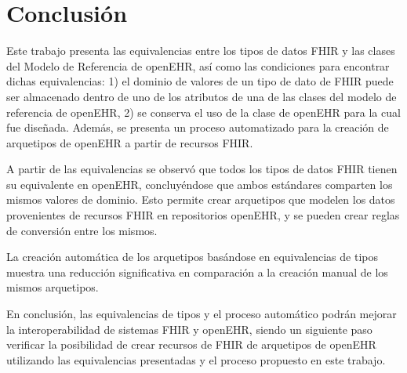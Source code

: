 \section{Conclusión}

Este trabajo presenta las equivalencias entre los tipos de datos FHIR y las clases del Modelo de Referencia de openEHR, así como las condiciones para encontrar dichas equivalencias: 1) el dominio de valores de un tipo de dato de FHIR puede ser almacenado dentro de uno de los atributos de una de las clases del modelo de referencia de openEHR, 2) se conserva el uso de la clase de openEHR para la cual fue diseñada. Además, se presenta un proceso automatizado para la creación de arquetipos de openEHR a partir de recursos FHIR.

A partir de las equivalencias se observó que todos los tipos de datos FHIR tienen su equivalente en openEHR, concluyéndose que ambos estándares comparten los mismos valores de dominio. Esto permite crear arquetipos que modelen los datos provenientes de recursos FHIR en repositorios openEHR, y se pueden crear reglas de conversión entre los mismos.

La creación automática de los arquetipos basándose en equivalencias de tipos muestra una reducción significativa en comparación a la creación manual de los mismos arquetipos.

En conclusión, las equivalencias de tipos y el proceso automático podrán mejorar la interoperabilidad de sistemas FHIR y openEHR, siendo un siguiente paso verificar la posibilidad de crear recursos de FHIR de arquetipos de openEHR utilizando las equivalencias presentadas y el proceso propuesto en este trabajo.
